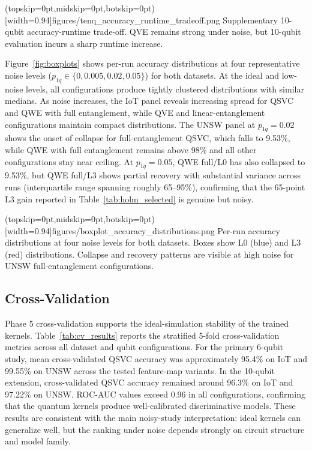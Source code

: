 \documentclass{ieeeaccess}
\begin{document}
\Figure[t!](topskip=0pt,midskip=0pt,botskip=0pt)[width=0.94\textwidth]{figures/tenq_accuracy_runtime_tradeoff.png}
{Supplementary 10-qubit accuracy-runtime trade-off. QVE remains strong under noise, but 10-qubit evaluation incurs a sharp runtime increase.\label{fig:tenq_tradeoff}}

Figure~\ref{fig:boxplots} shows per-run accuracy distributions at four representative noise levels ($p_{1q} \in \{0, 0.005, 0.02, 0.05\}$) for both datasets. At the ideal and low-noise levels, all configurations produce tightly clustered distributions with similar medians. As noise increases, the IoT panel reveals increasing spread for QSVC and QWE with full entanglement, while QVE and linear-entanglement configurations maintain compact distributions. The UNSW panel at $p_{1q}=0.02$ shows the onset of collapse for full-entanglement QSVC, which falls to 9.53\%, while QWE with full entanglement remains above 98\% and all other configurations stay near ceiling. At $p_{1q}=0.05$, QWE full/L0 has also collapsed to 9.53\%, but QWE full/L3 shows partial recovery with substantial variance across runs (interquartile range spanning roughly 65--95\%), confirming that the 65-point L3 gain reported in Table~\ref{tab:holm_selected} is genuine but noisy.

\Figure[t!](topskip=0pt,midskip=0pt,botskip=0pt)[width=0.94\textwidth]{figures/boxplot_accuracy_distributions.png}
{Per-run accuracy distributions at four noise levels for both datasets. Boxes show L0 (blue) and L3 (red) distributions. Collapse and recovery patterns are visible at high noise for UNSW full-entanglement configurations.\label{fig:boxplots}}

\subsection{Cross-Validation}

Phase 5 cross-validation supports the ideal-simulation stability of the trained kernels. Table~\ref{tab:cv_results} reports the stratified 5-fold cross-validation metrics across all dataset and qubit configurations. For the primary 6-qubit study, mean cross-validated QSVC accuracy was approximately 95.4\% on IoT and 99.55\% on UNSW across the tested feature-map variants. In the 10-qubit extension, cross-validated QSVC accuracy remained around 96.3\% on IoT and 97.22\% on UNSW. ROC-AUC values exceed 0.96 in all configurations, confirming that the quantum kernels produce well-calibrated discriminative models. These results are consistent with the main noisy-study interpretation: ideal kernels can generalize well, but the ranking under noise depends strongly on circuit structure and model family.
\end{document}
